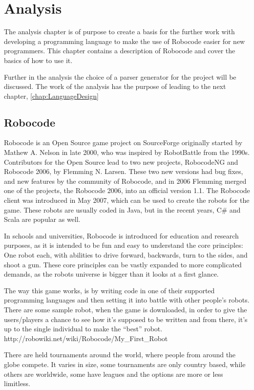 \chapter{Analysis}
\label{chap:Analysis}
The analysis chapter is of purpose to create a basis for the further work with developing a programming language to make the use of Robocode easier for new programmers. This chapter contains a description of Robocode and cover the basics of how to use it. 

Further in the analysis the choice of a parser generator for the project will be discussed. The work of the analysis has the purpose of leading to the next chapter, \ref{chap:LanguageDesign}

\section{Robocode}
\label{sec:Robocode}
Robocode is an Open Source game project on SourceForge originally started by Mathew A. Nelson in late 2000, who was inspired by RobotBattle from the 1990s. Contributors for the Open Source lead to two new projects, RobocodeNG and Robocode 2006, by Flemming N. Larsen. These two new versions had bug fixes, and new features by the community of Robocode, and in 2006 Flemming merged one of the projects, the Robocode 2006, into an official version 1.1.
The Robocode client was introduced in May 2007, which can be used to create the robots for the game. These robots are usually coded in Java, but in the recent years, C\# and Scala are popular as well. \citep{robocode}

In schools and universities, Robocode is introduced for education and research purposes, as it is intended to be fun and easy to understand the core principles: One robot each, with abilities to drive forward, backwards, turn to the sides, and shoot a gun. These core principles can be vastly expanded to more complicated demands, as the robots universe is bigger than it looks at a first glance. \citep{RoboReadMe}

The way this game works, is by writing code in one of their supported programming languages and then setting it into battle with other people’s robots. There are some sample robot, when the game is downloaded, in order to give the users/players a chance to see how it’s supposed to be written and from there, it’s up to the single individual to make the “best” robot. http://robowiki.net/wiki/Robocode/My\_First\_Robot

There are held tournaments around the world, where people from around the globe compete. It varies in size, some tournaments are only country based, while others are worldwide, some have leagues and the options are more or less limitless. \citep{rc}

